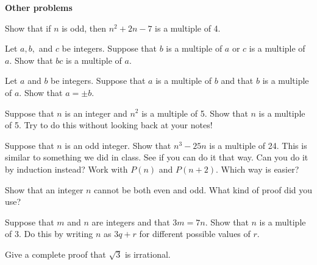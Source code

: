 \elist

\noindent
{\bf Other problems}
\blist{0.2in}



\item Show that if $n$ is odd, then $n^2 + 2n - 7$ is a multiple of 4.

\item Let $a, b,$ and $c$ be integers.
Suppose that $b$ is a multiple of $a$ or $c$ is a multiple of $a$.
Show that $bc$ is a multiple of $a$.

\item Let $a$ and $b$ be integers.
Suppose that $a$ is a multiple of $b$ and that $b$ is a multiple of $a$.
Show that $a = \pm b$.

\item Suppose that $n$ is an integer and $n^2$ is a multiple of 5.
Show that $n$ is a multiple of 5.
Try to do this without looking back at your notes!

\item Suppose that $n$ is an odd integer.
Show that $n^3 - 25n$ is a multiple of 24.
This is similar to something we did in class.
See if you can do it that way.
Can you do it by induction instead?
Work with $P(n)$ and $P(n+2)$.
Which way is easier?

\item Show that an integer $n$ cannot be both even and odd.
What kind of proof did you use?

\item Suppose that $m$ and $n$ are integers and that $3m = 7n$.
Show that $n$ is a multiple of 3.
Do this by writing $n$ as $3q+r$ for different possible values of $r$.

\item Give a complete proof that $\sqrt{3}$ is irrational.

\elist

\vfill          %
